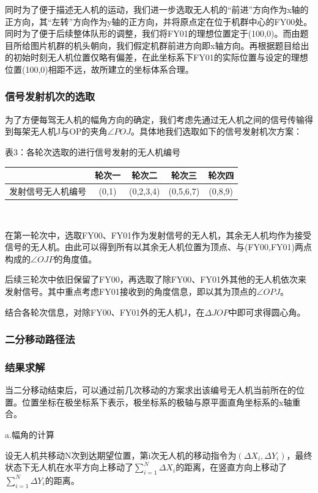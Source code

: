 \documentclass{ctexart}
\begin{document}
同时为了便于描述无人机的运动，我们进一步选取无人机的“前进”方向作为x轴的正方向，其“左转”方向作为y轴的正方向，并将原点定在位于机群中心的FY00处。同时为了便于后续整体队形的调整，我们将FY01的理想位置定于(100,0)。而由题目所给图片机群的机头朝向，我们假定机群前进方向即x轴方向。再根据题目给出的初始时刻无人机位置仅略有偏差，在此坐标系下FY01的实际位置与设定的理想位置(100,0)相距不远，故所建立的坐标体系合理。

  \subsubsection{信号发射机次的选取}
  为了方便每驾无人机的幅角方向的确定，我们考虑先通过无人机之间的信号传输得到每架无人机J与OP的夹角$\angle POJ$。具体地我们选取如下的信号发射机次方案：

  \begin{center}
  表3：各轮次选取的进行信号发射的无人机编号
  ~\\
    \begin{tabular}{|c|c|c|c|c|}
        \hline
        &轮次一&轮次二&轮次三&轮次四\\ 
        \hline
        发射信号无人机编号&(0,1)&(0,2,3,4)&(0,5,6,7)&(0,8,9)\\
        \hline
    \end{tabular}\\
  \end{center}

在第一轮次中，选取FY00、FY01作为发射信号的无人机，其余无人机均作为接受信号的无人机。由此可以得到所有以其余无人机位置为顶点、与(FY00,FY01)两点构成的$\angle OJP$的角度值。

后续三轮次中依旧保留了FY00，再选取了除FY00、FY01外其他的无人机依次来发射信号。其中重点考虑FY01接收到的角度信息，即以其为顶点的$\angle OPJ$。

结合各轮次信息，对除FY00、FY01外的无人机J，在$\Delta JOP$中即可求得圆心角。

\subsubsection{二分移动路径法}
\subsubsection{结果求解}
当二分移动结束后，可以通过前几次移动的方案求出该编号无人机当前所在的位置。位置坐标在极坐标系下表示，极坐标系的极轴与原平面直角坐标系的x轴重合。

a.幅角的计算

设无人机共移动N次到达期望位置，第i次无人机的移动指令为$(\Delta X_i,\Delta Y_i)$，最终状态下无人机在水平方向上移动了$\sum_{i=1}^{N}\Delta X_i$的距离，在竖直方向上移动了$\sum_{i=1}^{N}\Delta Y_i$的距离。
\end{document}
